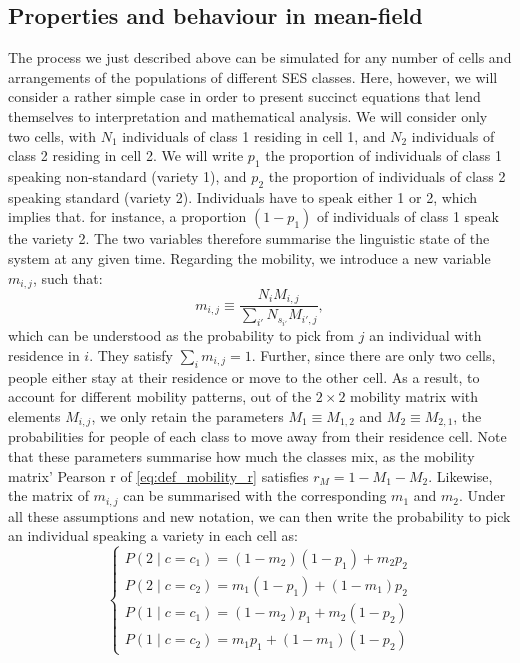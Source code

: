 \documentclass[../thesis.tex]{subfiles}
\begin{document}
\subsection{Properties and behaviour in mean-field}
The process we just described above can be simulated for any number of cells and
arrangements of the populations of different \ac{SES} classes. Here, however, we will
consider a rather simple case in order to present succinct equations that lend
themselves to interpretation and mathematical analysis. We will consider only two cells,
with $N_1$ individuals of class 1 residing in cell 1, and $N_2$ individuals of class 2
residing in cell 2. We will
write $p_1$ the proportion of individuals of class 1 speaking non-standard (variety 1),
and $p_2$ the proportion of individuals of class 2 speaking standard (variety 2).
Individuals have to speak either 1 or 2, which implies that. for instance, a proportion
$(1 - p_1)$ of individuals of class 1 speak the variety 2. The two variables therefore
summarise the linguistic state of the system at any given time. Regarding the mobility,
we introduce a new variable $m_{i, j}$, such that:
\begin{equation}
  m_{i, j} \equiv \frac{N_{i} M_{i, j}}{\sum_{i'} N_{s_{i'}} M_{i', j}},
\end{equation}
which can be understood as the probability to pick from $j$ an individual with residence
in $i$. They satisfy $\sum_i m_{i, j} = 1$. Further, since there are only two cells,
people either stay at their residence or move to the other cell. As a result, to account
for different mobility patterns, out of the $2 \times 2$ mobility matrix with elements
$M_{i, j}$, we only retain the parameters $M_1 \equiv M_{1, 2}$ and $M_2 \equiv M_{2,
1}$, the probabilities for people of each class to move away from their residence cell.
Note that these parameters summarise how much the classes mix, as the mobility
matrix' Pearson r of \cref{eq:def_mobility_r} satisfies $r_M = 1 - M_1 - M_2$. Likewise,
the matrix of $m_{i, j}$ can be summarised with the corresponding $m_1$ and $m_2$. Under
all these assumptions and new notation, we can then write the probability to pick an
individual speaking a variety in each cell as:
\begin{equation}
  \left\{
  \begin{aligned}
      P(2 \mid c = c_1)
          = (1 - m_2) (1 - p_1) + m_2 p_2
      \\
      P(2 \mid c = c_2)
          = m_1 (1 - p_1) + (1 - m_1) p_2
      \\
      P(1 \mid c = c_1)
          = (1 - m_2) p_1 + m_2 (1 - p_2)
      \\
      P(1 \mid c = c_2)
          = m_1 p_1 + (1 - m_1) (1 - p_2)
  \end{aligned}
  \right.
\end{equation}
\end{document}

